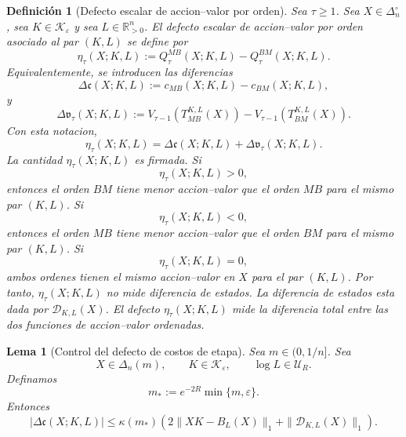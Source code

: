 \documentclass[12pt]{article}
\newtheorem{definicion}{Definición}[section]
\newtheorem{lema}{Lema}[section]
\begin{document}
\begin{definicion}[Defecto escalar de accion--valor por orden]\label{def:defecto_escalar_accion_valor_orden}
Sea \(\tau\ge 1\). Sea \(X\in\Delta_n^\circ\), sea \(K\in\mathcal K_\varepsilon\) y sea \(L\in\mathbb R_{>0}^n\). El defecto escalar de accion--valor por orden asociado al par \((K,L)\) se define por
\[
\eta_\tau(X;K,L)
:=
Q_\tau^{MB}(X;K,L)-Q_\tau^{BM}(X;K,L).
\]
Equivalentemente, se introducen las diferencias
\[
\Delta\mathfrak c(X;K,L)
:=
c_{MB}(X;K,L)-c_{BM}(X;K,L),
\]
y
\[
\Delta\mathfrak v_\tau(X;K,L)
:=
V_{\tau-1}\!\left(T_{MB}^{K,L}(X)\right)
-
V_{\tau-1}\!\left(T_{BM}^{K,L}(X)\right).
\]
Con esta notacion,
\[
\eta_\tau(X;K,L)
=
\Delta\mathfrak c(X;K,L)
+
\Delta\mathfrak v_\tau(X;K,L).
\]
La cantidad \(\eta_\tau(X;K,L)\) es firmada. Si
\[
\eta_\tau(X;K,L)>0,
\]
entonces el orden \(BM\) tiene menor accion--valor que el orden \(MB\) para el mismo par \((K,L)\). Si
\[
\eta_\tau(X;K,L)<0,
\]
entonces el orden \(MB\) tiene menor accion--valor que el orden \(BM\) para el mismo par \((K,L)\). Si
\[
\eta_\tau(X;K,L)=0,
\]
ambos ordenes tienen el mismo accion--valor en \(X\) para el par \((K,L)\).
Por tanto, \(\eta_\tau(X;K,L)\) no mide diferencia de estados. La diferencia de estados esta dada por \(\mathcal D_{K,L}(X)\). El defecto \(\eta_\tau(X;K,L)\) mide la diferencia total entre las dos funciones de accion--valor ordenadas.
\end{definicion}

\begin{lema}[Control del defecto de costos de etapa]\label{lem:control_defecto_costos_etapa}
Sea \(m\in(0,1/n]\). Sea
\[
X\in\Delta_n(m),
\qquad
K\in\mathcal K_\varepsilon,
\qquad
\log L\in\mathcal U_R.
\]
Definamos
\[
m_*:=e^{-2R}\min\{m,\varepsilon\}.
\]
Entonces
\[
|\Delta\mathfrak c(X;K,L)|
\le
\kappa(m_*)
\left(
2\|XK-B_L(X)\|_1
+
\|\mathcal D_{K,L}(X)\|_1
\right).
\]
\end{lema}
\end{document}
